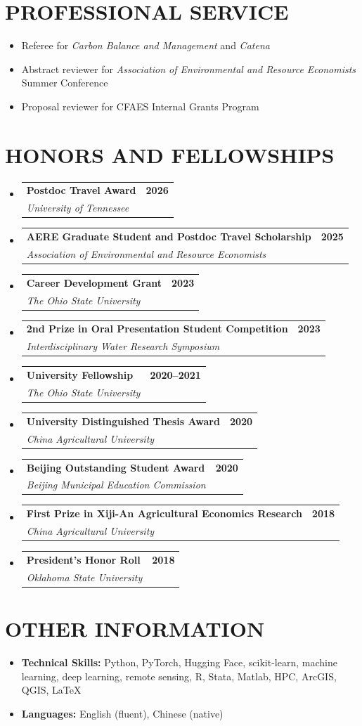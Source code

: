 \documentclass[letterpaper,11pt]{article}
\makeatletter
\newcommand{\resumeSubheading}[4]{
  \vspace{3pt}\item
    \begin{tabular*}{0.97\textwidth}[t]{l@{\extracolsep{\fill}}r}
      \textbf{#1} & \textbf{#2} \\
      \textit{\small#3} & \textit{\small#4} \\
    \end{tabular*}\vspace{3pt}
}
\newcommand{\resumeItemListStart}{
    \begin{itemize}[leftmargin=0.15in, label=\textbullet, itemsep=3pt, parsep=3pt]
}
\newcommand{\resumeItemListEnd}{\end{itemize}}
\makeatother
\begin{document}
\section{PROFESSIONAL SERVICE}
\begin{itemize}[leftmargin=1em, itemsep=4pt]
    \item[\small\textbullet] Referee for \textit{Carbon Balance and Management} and \textit{Catena}
    \item[\small\textbullet] Abstract reviewer for \textit{Association of Environmental and Resource Economists} Summer Conference
    \item[\small\textbullet] Proposal reviewer for CFAES Internal Grants Program
\end{itemize}

\section{HONORS AND FELLOWSHIPS}
\resumeItemListStart
    \resumeSubheading
        {Postdoc Travel Award}{2026}
        {University of Tennessee}{}
    \resumeSubheading
        {AERE Graduate Student and Postdoc Travel Scholarship}{2025}
        {Association of Environmental and Resource Economists}{}
        \resumeSubheading
        {Career Development Grant}{2023}
        {The Ohio State University}{}
    \resumeSubheading
        {2nd Prize in Oral Presentation Student Competition}{2023}
        {Interdisciplinary Water Research Symposium}{}
    \resumeSubheading
        {University Fellowship}{2020--2021}
        {The Ohio State University}{}
    \resumeSubheading
        {University Distinguished Thesis Award}{2020}
        {China Agricultural University}{}
    \resumeSubheading
        {Beijing Outstanding Student Award}{2020}
        {Beijing Municipal Education Commission}{}
    \resumeSubheading
        {First Prize in Xiji-An Agricultural Economics Research}{2018}
        {China Agricultural University}{}
    \resumeSubheading
        {President's Honor Roll}{2018}
        {Oklahoma State University}{}
\resumeItemListEnd

\section{OTHER INFORMATION}
\begin{itemize}[leftmargin=1em, itemsep=4pt]
    \item[\small\textbullet] \textbf{Technical Skills:} Python, PyTorch, Hugging Face, scikit-learn, machine learning, deep learning, remote sensing, R, Stata, Matlab, HPC, ArcGIS, QGIS, LaTeX
    \item[\small\textbullet] \textbf{Languages:} English (fluent), Chinese (native)
\end{itemize}
\end{document}
